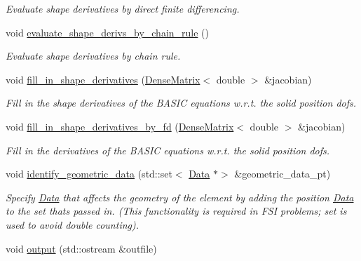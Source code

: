 \begin{DoxyCompactItemize}
\begin{DoxyCompactList}\small\item\em Evaluate shape derivatives by direct finite differencing. \end{DoxyCompactList}\item 
void \hyperlink{classoomph_1_1PseudoSolidNodeUpdateElement_a9f60c036205aacef2a97aafffb616d85}{evaluate\+\_\+shape\+\_\+derivs\+\_\+by\+\_\+chain\+\_\+rule} ()
\begin{DoxyCompactList}\small\item\em Evaluate shape derivatives by chain rule. \end{DoxyCompactList}\item 
void \hyperlink{classoomph_1_1PseudoSolidNodeUpdateElement_a254e54579d692d4480e30dee7c6b71cc}{fill\+\_\+in\+\_\+shape\+\_\+derivatives} (\hyperlink{classoomph_1_1DenseMatrix}{Dense\+Matrix}$<$ double $>$ \&jacobian)
\begin{DoxyCompactList}\small\item\em Fill in the shape derivatives of the B\+A\+S\+IC equations w.\+r.\+t. the solid position dofs. \end{DoxyCompactList}\item 
void \hyperlink{classoomph_1_1PseudoSolidNodeUpdateElement_a6f5600cb23d1e26816ae36ae8195c01e}{fill\+\_\+in\+\_\+shape\+\_\+derivatives\+\_\+by\+\_\+fd} (\hyperlink{classoomph_1_1DenseMatrix}{Dense\+Matrix}$<$ double $>$ \&jacobian)
\begin{DoxyCompactList}\small\item\em Fill in the derivatives of the B\+A\+S\+IC equations w.\+r.\+t. the solid position dofs. \end{DoxyCompactList}\item 
void \hyperlink{classoomph_1_1PseudoSolidNodeUpdateElement_a2067e391f1fb7eccf8758e3787b3ba0d}{identify\+\_\+geometric\+\_\+data} (std\+::set$<$ \hyperlink{classoomph_1_1Data}{Data} $\ast$$>$ \&geometric\+\_\+data\+\_\+pt)
\begin{DoxyCompactList}\small\item\em Specify \hyperlink{classoomph_1_1Data}{Data} that affects the geometry of the element by adding the position \hyperlink{classoomph_1_1Data}{Data} to the set that\textquotesingle{}s passed in. (This functionality is required in F\+SI problems; set is used to avoid double counting). \end{DoxyCompactList}\item 
void \hyperlink{classoomph_1_1PseudoSolidNodeUpdateElement_a41addbcf4a1ed2711e24632c8a122dcb}{output} (std\+::ostream \&outfile)
$$
\end{DoxyCompactItemize}
